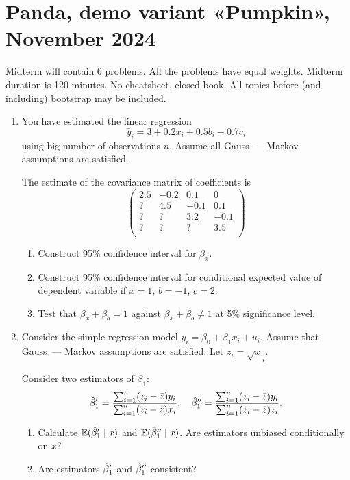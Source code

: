 \section{Panda, demo variant «Pumpkin», November 2024}

Midterm will contain 6 problems. 
All the problems have equal weights. 
Midterm duration is 120 minutes. 
No cheatsheet, closed book. 
All topics before (and including) bootstrap may be included. 

\begin{enumerate}
    \item You have estimated the linear regression 
    \[
    \hat y_i  = 3 + 0.2 x_i + 0.5 b_i - 0.7 c_i
    \]
    using big number of observations $n$. 
    Assume all Gauss~— Markov assumptions are satisfied. 

    The estimate of the covariance matrix of coefficients is 
    \[
    \begin{pmatrix}
        2.5 & -0.2 & 0.1  & 0 \\
        ?   &  4.5 & -0.1 & 0.1 \\
        ?   &   ?  & 3.2  & -0.1 \\
        ?   &   ?  &  ?   &  3.5 \\       
    \end{pmatrix}
    \]
    \begin{enumerate}
        \item Construct 95\% confidence interval for $\beta_x$.
        \item Construct 95\% confidence interval for conditional expected value of dependent variable if $x = 1$, $b = -1$, $c = 2$.
        \item Test that $\beta_x + \beta_b = 1$ against $\beta_ x + \beta_b \neq 1$ at 5\% significance level.
    \end{enumerate}


    \item Consider the simple regression model $y_i = \beta_0 + \beta_1 x_i + u_i$.
    Assume that Gauss~— Markov assumptions are satisfied.
    Let $z_i = \sqrt{x}_i$.

    Consider two estimators of $\beta_1$:
    \[
    \hat{\beta}_1' = \frac{\sum_{i=1}^n(z_i - \bar z)y_i}{\sum_{i=1}^n(z_i - \bar z)x_i}, \quad \hat{\beta}_1'' = \frac{\sum_{i=1}^n(z_i - \bar z)y_i}{\sum_{i=1}^n(z_i - \bar z)z_i}.
    \]
    \begin{enumerate}
        \item Calculate $\operatorname{\mathbb{E}}(\hat{\beta}_1' \mid x)$ and $\operatorname{\mathbb{E}}(\hat{\beta}_1'' \mid x)$. Are estimators unbiased conditionally on $x$?
        \item Are estimators $\hat{\beta}_1'$ and $\hat{\beta}_1''$ consistent?
    \end{enumerate}



\end{enumerate}
